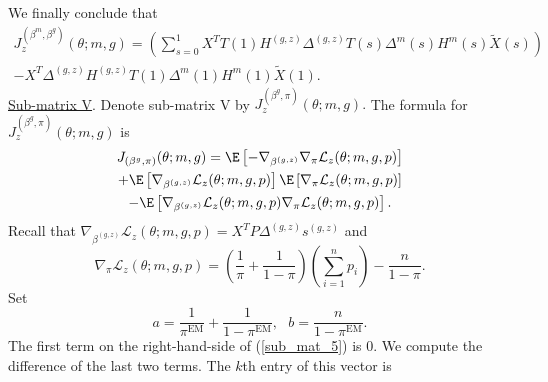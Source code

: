 \documentclass[12pt]{article}
\begin{document}
We finally conclude that 
\begin{multline}\label{sub_mat_4_formula} J_z^{(\beta^m, \beta^g)}(\theta; m, g) = \left(\sum_{s=0}^1 X^T  T(1) H^{(g,z)} \Delta^{(g,z)} T(s) \Delta^m(s) H^m(s) \tilde{X}(s) \right) \\ - X^T \Delta^{(g,z)} H^{(g,z)} T(1) \Delta^m(1)H^m(1) \tilde{X}(1).
\end{multline}
\noindent
\underline{Sub-matrix V}. Denote sub-matrix V by $J_z^{(\beta^g,\pi)}(\theta; m, g).$ The formula for $J_z^{(\beta^g,\pi)}(\theta; m, g)$ is
\begin{multline}\label{sub_mat_5}
J_{(\beta^g,\pi)}(\theta; m,g) = \E \left[-\nabla_{\beta^{(g,z)}} \nabla_{\pi} \mathcal{L}_z(\theta; m, g, p) \right] \\ + \E\left[ \nabla_{\beta^{(g,z)}}\mathcal{L}_z(\theta; m, g ,p)\right] \E \left[ \nabla_{\pi}\mathcal{L}_z(\theta; m,g,p) \right] \\ - \E \left[ \nabla_{\beta^{(g,z)}}\mathcal{L}_z(\theta; m,g,p) \nabla_{\pi}\mathcal{L}_z(\theta; m,g,p) \right].
\end{multline} Recall that $\nabla_{\beta^{(g,z)}} \mathcal{L}_z(\theta; m, g, p) = X^T P \Delta^{(g,z)}s^{(g,z)}$ and $$ \nabla_\pi \mathcal{L}_z(\theta; m, g, p) = \left( \frac{1}{\pi} + \frac{1}{1 - \pi} \right) \left(\sum_{i=1}^n p_i\right)  - \frac{n}{1 - \pi}.$$  Set $$a = \frac{1}{\pi^\textrm{EM}} + \frac{1}{1 - \pi^\textrm{EM}}, \textrm{    } b = \frac{n}{1 - \pi^\textrm{EM}}.$$ The first term on the right-hand-side of (\ref{sub_mat_5}) is $0$. We compute the difference of the last two terms. The $k$th entry of this vector is
\end{document}
